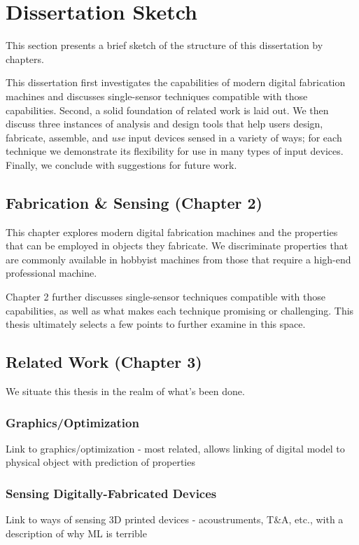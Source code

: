 \section{Dissertation Sketch}

This section presents a brief sketch of the structure of this dissertation by chapters.

This dissertation first investigates the capabilities of modern digital fabrication machines and discusses single-sensor techniques compatible with those capabilities. Second, a solid foundation of related work is laid out. We then discuss three instances of analysis and design tools that help users design, fabricate, assemble, and \emph{use} input devices sensed in a variety of ways; for each technique we demonstrate its flexibility for use in many types of input devices. Finally, we conclude with suggestions for future work.

\subsection{Fabrication \& Sensing (Chapter 2)}

This chapter explores modern digital fabrication machines and the properties that can be employed in objects they fabricate. We discriminate properties that are commonly available in hobbyist machines from those that require a high-end professional machine.

Chapter 2 further discusses single-sensor techniques compatible with those capabilities, as well as what makes each technique promising or challenging. This thesis ultimately selects a few points to further examine in this space.

\subsection{Related Work (Chapter 3)}

We situate this thesis in the realm of what's been done.

\subsubsection{Graphics/Optimization}
Link to graphics/optimization - most related, allows linking of digital model to physical object with prediction of properties

\subsubsection{Sensing Digitally-Fabricated Devices}
Link to ways of sensing 3D printed devices - acoustruments, T\&A, etc., with a description of why ML is terrible

